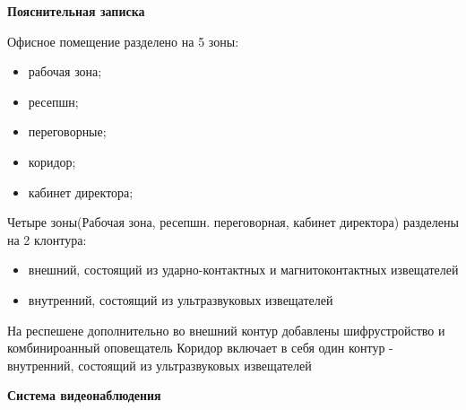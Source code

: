 \documentclass[a4paper,14pt]{extarticle}
\begin{document}
    \textbf{Пояснительная записка}
    \begin{spacing}{1.25}
        Офисное помещение разделено на 5 зоны:
        \vspace{-1ex}
        \begin{spacing}{0.5}
            \begin{itemize}
                \item рабочая зона;
                \item ресепшн;
                \item переговорные; 
                \item коридор;
                \item кабинет директора;
            \end{itemize}
        \end{spacing}
        Четыре зоны(Рабочая зона, ресепшн. переговорная, кабинет директора) разделены на 2 клонтура:
        \begin{spacing}{0.5}
            \begin{itemize}
                \item внешний, состоящий из ударно-контактных и магнитоконтактных извещателей
                \item внутренний, состоящий из ультразвуковых извещателей 
            \end{itemize}
        \end{spacing}
        На респешене дополнительно во внешний контур добавлены шифрустройство и комбинироанный оповещатель
        Коридор включает в себя один контур - внутренний, состоящий из ультразвуковых извещателей
    \end{spacing}
    
    \newpage
    \textbf{\large{Система видеонаблюдения}}
\end{document}
